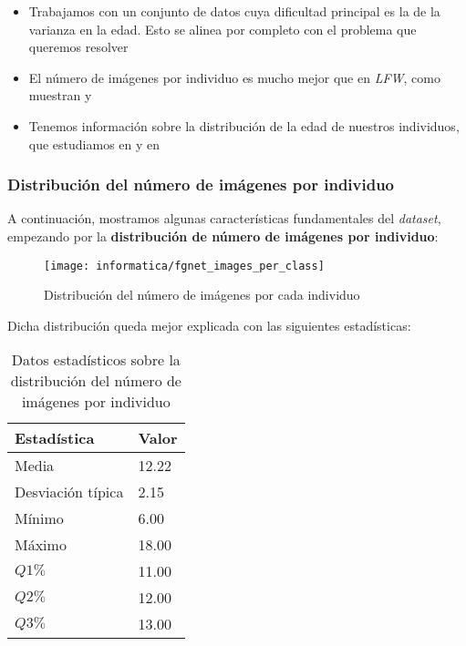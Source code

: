 \begin{itemize}
    \item Trabajamos con un conjunto de datos cuya dificultad principal es la de la varianza en la edad. Esto se alinea por completo con el problema que queremos resolver
    \item El número de imágenes por individuo es mucho mejor que en \textit{LFW}, como muestran  y 
    \item Tenemos información sobre la distribución de la edad de nuestros individuos, que estudiamos en  y en 
\end{itemize}

\subsubsection{Distribución del número de imágenes por individuo}

A continuación, mostramos algunas características fundamentales del \textit{dataset}, empezando por la \textbf{distribución de número de imágenes por individuo}:

\begin{figure}[H]
    \centering
    \texttt{[image: informatica/fgnet\_images\_per\_class]}
    \caption{Distribución del número de imágenes por cada individuo}
    \label{img:fgnet_images_per_class}
\end{figure}

Dicha distribución queda mejor explicada con las siguientes estadísticas:

\begin{table}[H]
\centering
\begin{tabular}{|l|l|}
    \hline
    \textbf{Estadística} & \textbf{Valor} \\
    \hline

    Media             & 12.22 \\
    Desviación típica & 2.15  \\
    Mínimo            & 6.00 \\
    Máximo            & 18.00 \\
    $Q1 \%$           & 11.00 \\
    $Q2 \%$           & 12.00 \\
    $Q3 \%$           & 13.00 \\

    \hline

\end{tabular}
\caption{Datos estadísticos sobre la distribución del número de imágenes por individuo}
\label{table:fgnet_images_per_class}
\end{table}

